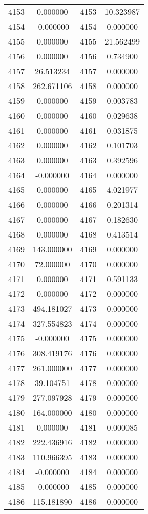 \documentclass[12pt]{article}
\begin{document}
\begin{longtable}{@{}cccc@{}}
4153 & 0.000000 & 4153 & 10.323987 \\
4154 & -0.000000 & 4154 & 0.000000 \\
4155 & 0.000000 & 4155 & 21.562499 \\
4156 & 0.000000 & 4156 & 0.734900 \\
4157 & 26.513234 & 4157 & 0.000000 \\
4158 & 262.671106 & 4158 & 0.000000 \\
4159 & 0.000000 & 4159 & 0.003783 \\
4160 & 0.000000 & 4160 & 0.029638 \\
4161 & 0.000000 & 4161 & 0.031875 \\
4162 & 0.000000 & 4162 & 0.101703 \\
4163 & 0.000000 & 4163 & 0.392596 \\
4164 & -0.000000 & 4164 & 0.000000 \\
4165 & 0.000000 & 4165 & 4.021977 \\
4166 & 0.000000 & 4166 & 0.201314 \\
4167 & 0.000000 & 4167 & 0.182630 \\
4168 & 0.000000 & 4168 & 0.413514 \\
4169 & 143.000000 & 4169 & 0.000000 \\
4170 & 72.000000 & 4170 & 0.000000 \\
4171 & 0.000000 & 4171 & 0.591133 \\
4172 & 0.000000 & 4172 & 0.000000 \\
4173 & 494.181027 & 4173 & 0.000000 \\
4174 & 327.554823 & 4174 & 0.000000 \\
4175 & -0.000000 & 4175 & 0.000000 \\
4176 & 308.419176 & 4176 & 0.000000 \\
4177 & 261.000000 & 4177 & 0.000000 \\
4178 & 39.104751 & 4178 & 0.000000 \\
4179 & 277.097928 & 4179 & 0.000000 \\
4180 & 164.000000 & 4180 & 0.000000 \\
4181 & 0.000000 & 4181 & 0.000085 \\
4182 & 222.436916 & 4182 & 0.000000 \\
4183 & 110.966395 & 4183 & 0.000000 \\
4184 & -0.000000 & 4184 & 0.000000 \\
4185 & -0.000000 & 4185 & 0.000000 \\
4186 & 115.181890 & 4186 & 0.000000 \\

\end{longtable}
\end{document}
